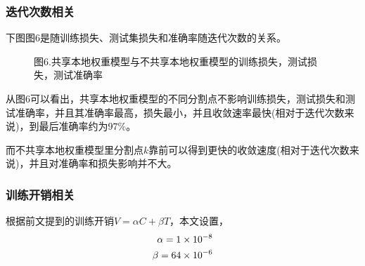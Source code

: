 \documentclass{article}
\begin{document}
\subsubsection{迭代次数相关}
下图图6是随训练损失、测试集损失和准确率随迭代次数的关系。
\begin{figure}[H]
    \centering
    \caption*{图6.共享本地权重模型与不共享本地权重模型的训练损失，测试损失，测试准确率}
\end{figure}

从图6可以看出，共享本地权重模型的不同分割点不影响训练损失，测试损失和测试准确率，并且其准确率最高，损失最小，并且收敛速率最快(相对于迭代次数来说)，到最后准确率约为$97\%$。

⽽不共享本地权重模型⾥分割点$k$靠前可以得到更快的收敛速度(相对于迭代次数来说)，并且对准确率和损失影响并不大。

\subsubsection{训练开销相关}
根据前文提到的训练开销$V=\alpha C +\beta T$，本文设置，
\begin{align}
    \alpha = 1\times 10^{-8} \notag \\
    \beta = 64 \times 10^{-6} 
\end{align}
\end{document}

